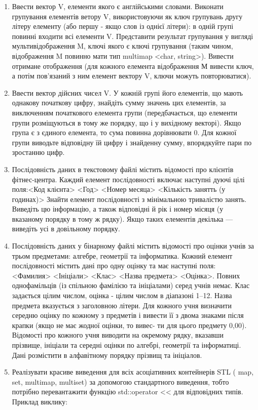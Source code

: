 \documentclass[]{article}
\begin{document}
\begin{enumerate}
\item
  Ввести вектор V, елементи якого є англійськими словами. Виконати
  групування елементів ветору V, використовуючи як ключ групувань другу
  літеру елементу (або першу - якщо слов із однієї літери): в одній
  групі повинні входити всі елементи V. Представити результат групування
  у вигляді мультивідображення M, ключі якого є ключі групування (таким
  чином, відображення M повинно мати тип multimap \textless{}char,
  string\textgreater{}). Вивести отримане отображення (для кожного
  елемента відображення М вивести ключ, а потім пов'язаний з ним елемент
  вектору V, ключи можуть повторюватися).
\item
  Ввести вектор дійсних чисел V. У кожній групі його елементів, що мають
  однакову початкову цифру, знайдіть сумму значень цих елементів, за
  виключенням початкового елемента групи (передбачається, що елементи
  групи розміщуються в тому же порядку, що і у вихідному векторі). Якщо
  група є з єдиного елемента, то сума повинна дорівнювати 0. Для кожної
  групи виводьте відповідну їй цифру і знайденну сумму, впорядкуйте пари
  по зростанню цифр.
\item
  Послідовність даних в текстовому файлі містить відомості про клієнтів
  фітнес-центра. Каждий елемент послідовності включає наступні дуючі
  цілі поля:\textless{}Код клієнта\textgreater{}
  \textless{}Год\textgreater{} \textless{}Номер месяца\textgreater{}
  \textless{}Кількість занятть (у годинах)\textgreater{} Знайти елемент
  послідовності з мінімальною тривалістю занять. Виведіть цю інформацію,
  а також відповідні й рік і номер місяця (у вказаному порядку в тому ж
  рядку). Якщо таких елементів декілька --- виведіть усі в довільному
  порядку.
\item
  Послідовність даних у бінарному файлі містить відомості про оцінки
  учнів за трьом предметами: алгебре, геометрії та інформатика. Кожний
  елемент послідовності містить дані про одну оцінку та має наступні
  поля: \textless{}Фамилия\textgreater{}
  \textless{}Ініціали\textgreater{} \textless{}Клас\textgreater{}
  \textless{}Назва предмета\textgreater{}
  \textless{}Оцінка\textgreater{}. Повних однофамільців (із спільною
  фамілією та ініціалами) серед учнів немає. Клас задається цілим
  числом, оцінка - цілим числом в діапазоні 1--12. Назва предмета
  вказується з заголовною літери. Для кожного учня визначити середню
  оцінку по кожному з предметів і вивести її з двома знаками після
  крапки (якщо не має жодної оцінки, то вивес- ти для цього предмету
  0,00). Відомості про кожного учня виводити на окремому рядку, вказавши
  прізвище, ініціали та середні оцінки по алгебрі, геометрії та
  інформатиці. Дані розмістити в алфавітному порядку прізвищ та
  ініціалов.
\item
  Реалізувати красиве виведення для всіх асоціативних контейнерів STL (
  map, set, multimap, multiset) за допомогою стандартного виведення,
  тобто потрібно перевантажити функцію std::operator
  \textless{}\textless{} для відповідних типів. Приклад виклику:


\end{enumerate}
\end{document}
